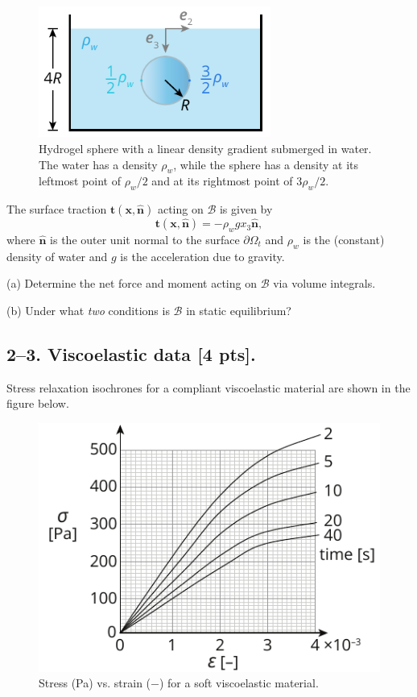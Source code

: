 \begin{figure}[H]
\vspace{-2em}
\centering
\includegraphics[width=3in]{instr-figures/PS2-Q1.pdf}
\caption{\small{Hydrogel sphere with a linear density gradient submerged in water. The water has a density $\rho_w$, while the sphere has a density at its leftmost point of $\rho_w/2$ and at its rightmost point of $3\rho_w/2$.}}
\end{figure}

\vspace{-1em}
The surface traction $\bm{t}(\bm{x},\hat{\bm{n}})$ acting on $\mathcal{B}$ is given by 
\begin{equation*}
\bm{t}(\bm{x},\hat{\bm{n}}) = -\rho_w g x_3 \hat{\bm{n}},
\end{equation*}
where $\hat{\bm{n}}$ is the outer unit normal to the surface $\partial \Omega_t$ and $\rho_w$ is the (constant) density of water and $g$ is the acceleration due to gravity. 

\medskip
(a) Determine the net force and moment acting on $\mathcal{B}$ via volume integrals.

\medskip
(b) Under what \textit{two} conditions is $\mathcal{B}$ in static equilibrium?


\bigskip
\subsection*{2--3. \textbf{Viscoelastic data} [4 pts].} 
Stress relaxation isochrones for a compliant viscoelastic material are shown in the figure below.  

\begin{figure}[H]
\vspace{-1em}
\centering
\includegraphics[scale = 1.5]{instr-figures/PS2-Q3.pdf}
\caption{\small{Stress (Pa) vs. strain ($-$) for a soft viscoelastic material.}}
\end{figure}

